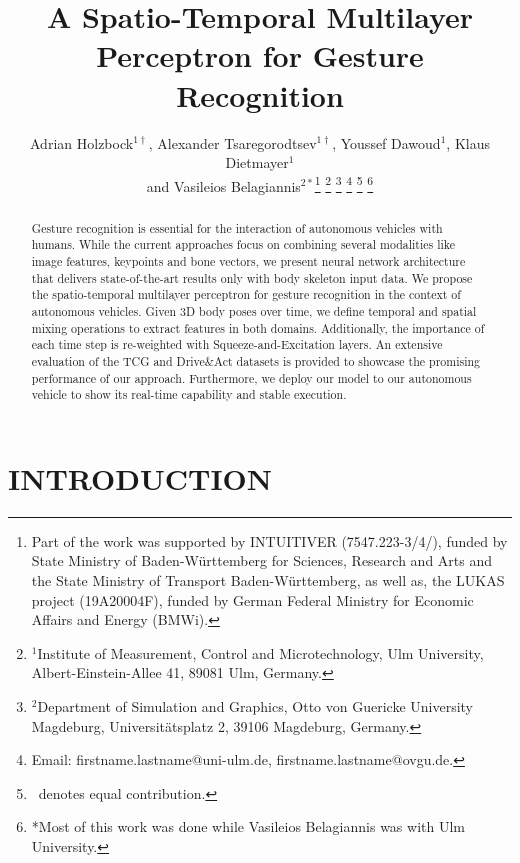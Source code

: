\documentclass[letterpaper, 10 pt, conference]{ieeeconf}
\title{\LARGE \bf
A Spatio-Temporal Multilayer Perceptron for Gesture Recognition
}
\author{Adrian Holzbock$^{1\dag}$, Alexander Tsaregorodtsev$^{1\dag}$, Youssef Dawoud$^{1}$, Klaus Dietmayer$^{1}$ \\ and Vasileios Belagiannis$^{2*}$\thanks{Part of the work was supported by INTUITIVER (7547.223-3/4/), funded by State Ministry of Baden-Württemberg for Sciences, Research and Arts and the State Ministry of Transport Baden-Württemberg, as well as, the LUKAS project (19A20004F), funded by German Federal Ministry for Economic Affairs and Energy (BMWi).}
\thanks{$^{1}$Institute of Measurement, Control and Microtechnology,
        Ulm University, Albert-Einstein-Allee 41, 89081 Ulm, Germany.}
\thanks{$^{2}$Department of Simulation and Graphics,
        Otto von Guericke University Magdeburg, Universitätsplatz 2, 39106 Magdeburg, Germany.}
\thanks{Email: firstname.lastname@uni-ulm.de, firstname.lastname@ovgu.de.}
\thanks{\dag\ denotes equal contribution.}
\thanks{*Most of this work was done while Vasileios Belagiannis was with Ulm University.}
}
\begin{document}
\newcommand\copyrighttextinitial{
    \scriptsize This work has been submitted to the IEEE for possible publication. Copyright may be transferred without notice, after which this version may no longer be accessible.}
    
\newcommand\copyrighttextfinal{
    \scriptsize\copyright\ 2022 IEEE. Personal use of this material is permitted. Permission from IEEE must be obtained for all other uses, in any current or future media, including reprinting/republishing this material for advertising or promotional purposes, creating new collective works, for resale or redistribution to servers or lists, or reuse of any copyrighted component of this work in other works. DOI: 10.1109/IV51971.2022.9827054.}
    
\newcommand\copyrightnotice{
}

\maketitle
\copyrightnotice
\thispagestyle{empty}
\pagestyle{empty}


\begin{abstract}

Gesture recognition is essential for the interaction of autonomous vehicles with humans. While the current approaches focus on combining several modalities like image features, keypoints and bone vectors, we present neural network architecture that delivers state-of-the-art results only with body skeleton input data. We propose the spatio-temporal multilayer perceptron for gesture recognition in the context of autonomous vehicles. Given 3D body poses over time, we define temporal and spatial mixing operations to extract features in both domains. Additionally, the importance of each time step is re-weighted with Squeeze-and-Excitation layers. An extensive evaluation of the TCG and Drive\&Act datasets is provided to showcase the promising performance of our approach. Furthermore, we deploy our model to our autonomous vehicle to show its real-time capability and stable execution.

\end{abstract}




\section{INTRODUCTION}
\end{document}
